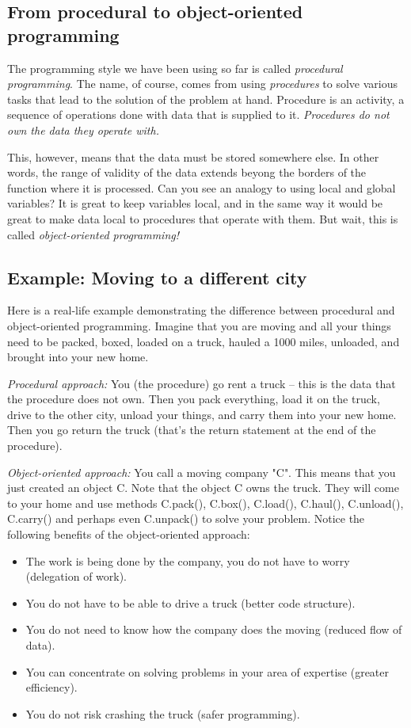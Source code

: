 \documentclass[article,A4,12pt]{llncs}
\begin{document}
\subsection{From procedural to object-oriented programming}

The programming style we have been using so far is called {\em procedural programming}.
The name, of course, comes from using {\em procedures} to solve various tasks that 
lead to the solution of the problem at hand. Procedure is an activity, a sequence of operations 
done with data that is supplied to it. {\em Procedures do not own the data they 
operate with.} 

This, however, means that the data must be stored somewhere else. In other
words, the range of validity of the data extends beyong the borders of the 
function where it is processed. 
Can you see an analogy to using local and global variables? It is great
to keep variables local, and in the same way it would be great to make
data local to procedures that operate with them. But wait, this is called {\em 
object-oriented programming!}

\subsection{Example: Moving to a different city}

Here is a real-life example demonstrating the difference between 
procedural and object-oriented programming. Imagine that you are moving 
and all your things need to be packed, boxed, loaded on a truck, hauled 
a 1000 miles, unloaded, and brought into your new home. 

{\em Procedural approach:} You (the procedure) 
go rent a truck -- this is the data that the procedure does not own. Then
you pack everything, load it on the truck, drive to the other city, 
unload your things, and carry them into your new home. Then you go 
return the truck (that's the return statement at the end of the procedure).

{\em Object-oriented approach:} You call a moving company "C". This means 
that you just created an object C. Note that the 
object C owns the truck. They will come to your home and use methods 
C.pack(), C.box(), C.load(), C.haul(), C.unload(), C.carry() and perhaps 
even C.unpack() to solve your problem. Notice the following benefits of the object-oriented approach: 
\begin{itemize}
\item The work is being done by the company, 
      you do not have to worry (delegation of work).
\item You do not have to be able to drive a truck (better code structure). 
\item You do not need to know how the company does the moving (reduced flow of data).
\item You can concentrate on solving problems 
      in your area of expertise (greater efficiency).
\item You do not risk crashing the truck (safer programming).
\end{itemize}
\end{document}
